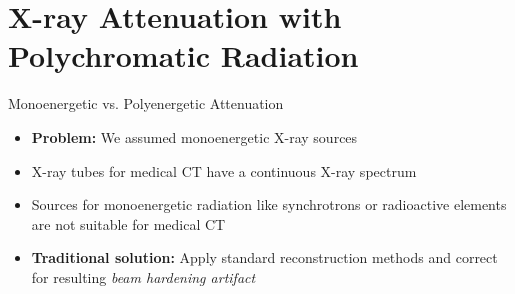 %


\section{X-ray Attenuation with Polychromatic Radiation}

\begin{frame}[c]{Monoenergetic vs. Polyenergetic Attenuation}
    \begin{itemize}
        \setlength\itemsep{0.4cm}
        \item \textbf{Problem:} We assumed monoenergetic X-ray sources
        \item X-ray tubes for medical CT have a continuous X-ray spectrum
        \item Sources for monoenergetic radiation like synchrotrons or radioactive elements are not suitable for medical CT
        \item \textbf{Traditional solution:} Apply standard reconstruction methods and correct for resulting \textit{beam hardening artifact}
    \end{itemize}
\end{frame}

